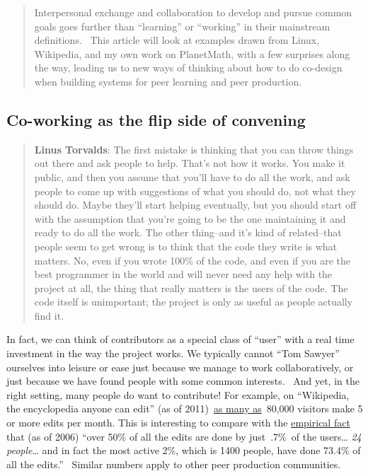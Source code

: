 \begin{quote}
Interpersonal exchange and collaboration to develop and pursue common
goals goes further than ``learning'' or ``working'' in their mainstream
definitions. ~This article will look at examples drawn from Linux,
Wikipedia, and my own work on PlanetMath, with a few surprises along the
way, leading us to new ways of thinking about how to do co-design when
building systems for peer learning and peer production.
\end{quote}

\subsection{Co-working as the flip side of
convening}\label{co-working-as-the-flip-side-of-convening}

\begin{quote}
\textbf{Linus Torvalds}: The first mistake is thinking that you can
throw things out there and ask people to help. That's not how it works.
You make it public, and then you assume that you'll have to do all the
work, and ask people to come up with suggestions of what you should do,
not what they should do. Maybe they'll start helping eventually, but you
should start off with the assumption that you're going to be the one
maintaining it and ready to do all the work. The other thing--and it's
kind of related--that people seem to get wrong is to think that the code
they write is what matters. No, even if you wrote 100\% of the code, and
even if you are the best programmer in the world and will never need any
help with the project at all, the thing that really matters is the users
of the code. The code itself is unimportant; the project is only as
useful as people actually find it.
\end{quote}

In fact, we can think of contributors as a special class of ``user''
with a real time investment in the way the project works. We typically
cannot ``Tom Sawyer'' ourselves into leisure or ease just because we
manage to work collaboratively, or just because we have found people
with some common interests.~ And yet, in the right setting, many people
do want to contribute! For example, on ``Wikipedia, the encyclopedia
anyone can edit'' (as of
2011)~\href{http://\%20http://www.readwriteweb.com/archives/wikipedias_goal_1_billion_monthly_visitors_by_2015.php}{as
many as}~80,000 visitors make 5 or more edits per month. This is
interesting to compare with the
\href{http://www.aaronsw.com/weblog/whowriteswikipedia}{empirical fact}
that (as of 2006) ``over 50\% of all the edits are done by just~.7\%~of
the users\ldots{} \emph{24 people}\ldots{} and in fact the most active
2\%, which is 1400 people, have done 73.4\% of all the edits.''~ Similar
numbers apply to other peer production communities.

